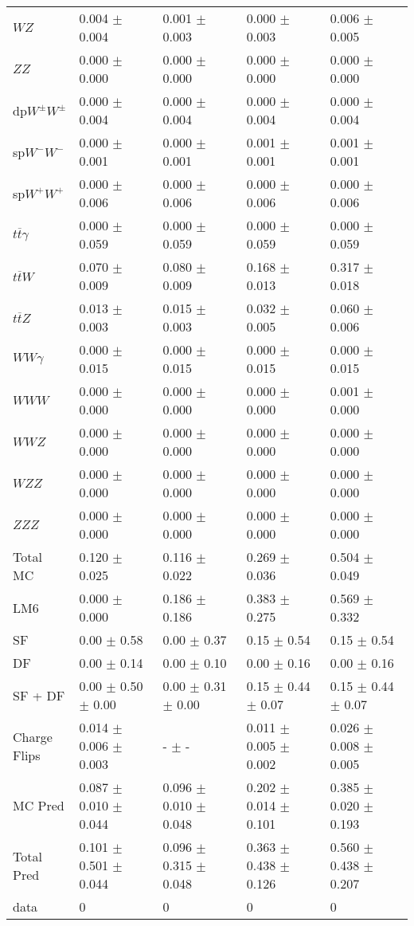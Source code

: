 \begin{tabular}{l | l l l l}
$WZ$ &  0.004 $\pm$  0.004 &  0.001 $\pm$  0.003 &   0.000 $\pm$  0.003 &  0.006 $\pm$  0.005\\
$ZZ$ &  0.000 $\pm$   0.000 &  0.000 $\pm$   0.000 &   0.000 $\pm$   0.000 &   0.000 $\pm$   0.000\\
\hline
dp$W^{\pm}W^{\pm}$ &  0.000 $\pm$  0.004 &  0.000 $\pm$  0.004 &  0.000 $\pm$  0.004 &  0.000 $\pm$  0.004\\
sp$W^{-}W^{-}$ &  0.000 $\pm$  0.001 &  0.000 $\pm$  0.001 &  0.001 $\pm$  0.001 &  0.001 $\pm$  0.001\\
sp$W^{+}W^{+}$ &  0.000 $\pm$  0.006 &  0.000 $\pm$  0.006 &  0.000 $\pm$  0.006 &  0.000 $\pm$  0.006\\
$t\overline{t}\gamma$ &  0.000 $\pm$  0.059 &  0.000 $\pm$  0.059 &  0.000 $\pm$  0.059 &  0.000 $\pm$  0.059\\
$t\overline{t}W$ &  0.070 $\pm$  0.009 &  0.080 $\pm$  0.009 &  0.168 $\pm$  0.013 &  0.317 $\pm$  0.018\\
$t\overline{t}Z$ &  0.013 $\pm$  0.003 &  0.015 $\pm$  0.003 &  0.032 $\pm$  0.005 &  0.060 $\pm$  0.006\\
$WW\gamma$ &  0.000 $\pm$  0.015 &  0.000 $\pm$  0.015 &  0.000 $\pm$  0.015 &  0.000 $\pm$  0.015\\
$WWW$ &  0.000 $\pm$   0.000 &   0.000 $\pm$   0.000 &   0.000 $\pm$   0.000 &  0.001 $\pm$   0.000\\
$WWZ$ &  0.000 $\pm$   0.000 &  0.000 $\pm$   0.000 &  0.000 $\pm$   0.000 &  0.000 $\pm$   0.000\\
$WZZ$ &   0.000 $\pm$   0.000 &  0.000 $\pm$   0.000 &   0.000 $\pm$   0.000 &   0.000 $\pm$   0.000\\
$ZZZ$ &  0.000 $\pm$   0.000 &  0.000 $\pm$   0.000 &  0.000 $\pm$   0.000 &  0.000 $\pm$   0.000\\
\hline
Total MC &  0.120 $\pm$  0.025 &  0.116 $\pm$  0.022 &  0.269 $\pm$  0.036 &  0.504 $\pm$  0.049\\
\hline\hline
\hline
LM6 &  0.000 $\pm$  0.000 &  0.186 $\pm$  0.186 &  0.383 $\pm$  0.275 &  0.569 $\pm$  0.332\\
\hline\hline
\hline\hline
 SF  & 0.00 $\pm$ 0.58 & 0.00 $\pm$ 0.37 & 0.15 $\pm$ 0.54 & 0.15 $\pm$ 0.54\\
 DF  & 0.00 $\pm$ 0.14 & 0.00 $\pm$ 0.10 & 0.00 $\pm$ 0.16 & 0.00 $\pm$ 0.16\\
\hline
 SF + DF  & 0.00 $\pm$ 0.50 $\pm$ 0.00 & 0.00 $\pm$ 0.31 $\pm$ 0.00 & 0.15 $\pm$ 0.44 $\pm$ 0.07 & 0.15 $\pm$ 0.44 $\pm$ 0.07\\
\hline\hline
Charge Flips & 0.014 $\pm$ 0.006 $\pm$ 0.003 & - $\pm$ - & 0.011 $\pm$ 0.005 $\pm$ 0.002 & 0.026 $\pm$ 0.008 $\pm$ 0.005\\
\hline\hline
\hline
MC Pred &  0.087 $\pm$  0.010 $\pm$  0.044 &  0.096 $\pm$  0.010 $\pm$  0.048 &  0.202 $\pm$  0.014 $\pm$  0.101 &  0.385 $\pm$  0.020 $\pm$  0.193\\
\hline\hline
Total Pred &  0.101 $\pm$  0.501 $\pm$  0.044 &  0.096 $\pm$  0.315 $\pm$  0.048 &  0.363 $\pm$  0.438 $\pm$  0.126 &  0.560 $\pm$  0.438 $\pm$  0.207\\
\hline\hline
data & 0 & 0 & 0 & 0\\
\hline\hline
\end{tabular}
